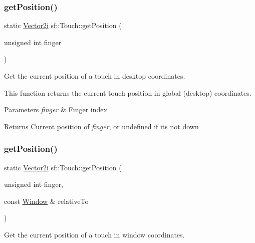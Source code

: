 \subsubsection{\texorpdfstring{get\+Position()}{getPosition()}\hspace{0.1cm}{\footnotesize\ttfamily [1/2]}}
{\footnotesize\ttfamily static \hyperlink{classsf_1_1_vector2}{Vector2i} sf\+::\+Touch\+::get\+Position (\begin{DoxyParamCaption}\item[{unsigned int}]{finger }\end{DoxyParamCaption})\hspace{0.3cm}{\ttfamily [static]}}



Get the current position of a touch in desktop coordinates. 

This function returns the current touch position in global (desktop) coordinates.


\begin{DoxyParams}{Parameters}
{\em finger} & Finger index\\
\hline
\end{DoxyParams}
\begin{DoxyReturn}{Returns}
Current position of {\itshape finger}, or undefined if it\textquotesingle{}s not down 
\end{DoxyReturn}
\mbox{\label{classsf_1_1_touch_a372acaba3c7ac70fca4614c16ac4a1bb}} 
\subsubsection{\texorpdfstring{get\+Position()}{getPosition()}\hspace{0.1cm}{\footnotesize\ttfamily [2/2]}}
{\footnotesize\ttfamily static \hyperlink{classsf_1_1_vector2}{Vector2i} sf\+::\+Touch\+::get\+Position (\begin{DoxyParamCaption}\item[{unsigned int}]{finger,  }\item[{const \hyperlink{classsf_1_1_window}{Window} \&}]{relative\+To }\end{DoxyParamCaption})\hspace{0.3cm}{\ttfamily [static]}}



Get the current position of a touch in window coordinates. 

